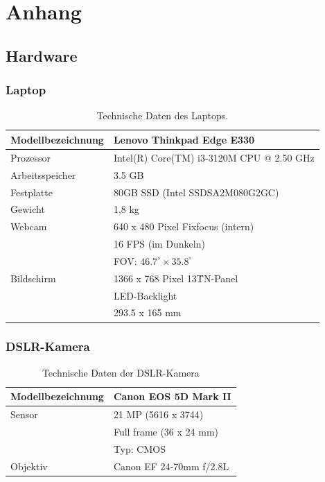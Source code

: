 \chapter{Anhang} \label{anhang}

\section{Hardware} \label{a:hardware}
  \subsection{Laptop}
  
\begin{table}[H]
  \begin{tabular}{|l|l|}
   \hline
    Modellbezeichnung 	& Lenovo Thinkpad Edge E330 \\
   \hline
    Prozessor		& Intel(R) Core(TM) i3-3120M CPU @ 2.50 GHz \\ 
   \hline
    Arbeitsspeicher 	& 3.5 GB \\
   \hline
    Festplatte		& 80GB SSD (Intel SSDSA2M080G2GC) \\
   \hline
    Gewicht		& 1,8 kg \\
   \hline
    Webcam		& 640 x 480 Pixel  Fixfocus  (intern)\\
                        & 16 FPS (im Dunkeln) \\
    			& FOV: $46.7^\circ \times 35.8^\circ$\\
   \hline
    Bildschirm		& 1366 x 768 Pixel 13\" TN-Panel \\
                        & LED-Backlight \\
    			& 293.5 x 165 mm \\
    \hline 
  \end{tabular} 
  \caption[Technische Daten des Laptops]{Technische Daten des Laptops.}

  \label{tab:laptop}
\end{table}

  \subsection{DSLR-Kamera}

\begin{table}[H]
  \begin{tabular}{|l|l|}
   \hline
    Modellbezeichnung 	& Canon EOS 5D Mark II \\
   \hline
    Sensor		& 21 MP (5616 x 3744) \\
    			& Full frame (36 x 24 mm) \\
    			& Typ: CMOS \\
   \hline
    Objektiv		& Canon EF 24-70mm f/2.8L \\
    \hline 
  \end{tabular} 
  \caption[Technische Daten der DSLR-Kamera]{Technische Daten der DSLR-Kamera}

  \label{tab:kamera}
\end{table}
\pagebreak
